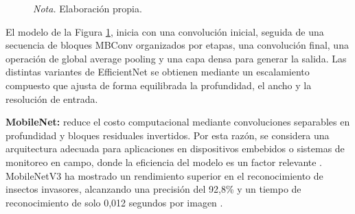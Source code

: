 \begin{figure}[h]
    \label{fig:estructura_general_efficientnet}

    \vspace{0.2cm}
    \caption*{\normalfont\normalsize\textit{Nota.} Elaboración propia.}
    
\end{figure}

\vspace{-0.5cm}
El modelo de la Figura \ref{fig:estructura_general_efficientnet}, inicia con una convolución inicial, seguida de una secuencia de bloques MBConv organizados por etapas, una convolución final, una operación de global average pooling y una capa densa para generar la salida. Las distintas variantes de EfficientNet se obtienen mediante un escalamiento compuesto que ajusta de forma equilibrada la profundidad, el ancho y la resolución de entrada. 

\par\indent\textbullet\hspace{0.2cm} \textbf{MobileNet:} reduce el costo computacional mediante convoluciones separables en profundidad y bloques residuales invertidos. Por esta razón, se considera una arquitectura adecuada para aplicaciones en dispositivos embebidos o sistemas de monitoreo en campo, donde la eficiencia del modelo es un factor relevante \parencite{Mambile2025,Srinivas2025}. MobileNetV3 ha mostrado un rendimiento superior en el reconocimiento de insectos invasores, alcanzando una precisión del 92,8\% y un tiempo de reconocimiento de solo 0,012 segundos por imagen \parencite{huang2024insect}. 

